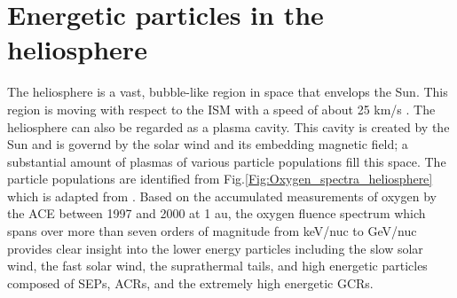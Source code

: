 \section{Energetic particles in the heliosphere}
\label{sec:particles_heliosphere}


The heliosphere is a vast, bubble-like region in space that envelops the Sun. This region is moving with respect to the \ac{ISM} with a speed of about 25 km/s \citep{McComas2015ApJS}. The heliosphere can also be regarded as a plasma cavity. This cavity is created by the Sun and is governd by the solar wind and its embedding magnetic field; a substantial amount of plasmas of various particle populations fill this space. The particle populations are identified from Fig.\ref{Fig:Oxygen_spectra_heliosphere} which is adapted from \citet{Mewaldt-2001}. Based on the accumulated measurements of oxygen by the \ac{ACE} between 1997 and 2000 at 1 au, the oxygen fluence spectrum which spans over more than seven orders of magnitude from keV/nuc to GeV/nuc provides clear insight into the lower energy particles including the slow solar wind, the fast solar wind, the suprathermal tails, and high energetic particles composed of \acp{SEP}, \acp{ACR}, and the extremely high energetic \acp{GCR}. 


